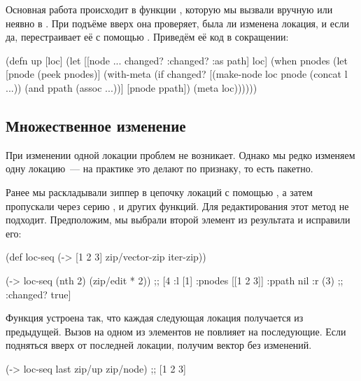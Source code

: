 Основная работа происходит в функции , которую мы вызвали вручную или
неявно в . При подъёме вверх она проверяет, была ли изменена локация,
и если да, перестраивает её с помощью . Приведём её код в сокращении:

\begin{english}
  \begin{clojure}
(defn up
  [loc]
  (let [[node {... changed? :changed? :as path}] loc]
    (when pnodes
      (let [pnode (peek pnodes)]
        (with-meta (if changed?
                     [(make-node loc pnode (concat l ...))
                      (and ppath (assoc ...))]
                     [pnode ppath])
                   (meta loc))))))
  \end{clojure}
\end{english}

\subsection{Множественное изменение}

При изменении одной локации проблем не возникает. Однако мы редко изменяем одну
локацию~--- на практике это делают по признаку, то есть пакетно.

Ранее мы раскладывали зиппер в цепочку локаций с помощью , а затем
пропускали через серию ,  и других функций. Для редактирования этот
метод не подходит. Предположим, мы выбрали второй элемент из результата
 и исправили его:

\begin{english}
  \begin{clojure}
(def loc-seq
  (-> [1 2 3]
      zip/vector-zip
      iter-zip))

(-> loc-seq (nth 2) (zip/edit * 2))
;; [4 {:l [1] :pnodes [[1 2 3]] :ppath nil :r (3)
;;    :changed? true}]
  \end{clojure}
\end{english}

Функция  устроена так, что каждая следующая локация получается из
предыдущей. Вызов  на одном из элементов не повлияет на
последующие. Если подняться вверх от последней локации, получим вектор без
изменений.

\begin{english}
  \begin{clojure}
(-> loc-seq last zip/up zip/node)
;; [1 2 3]
  \end{clojure}
\end{english}

